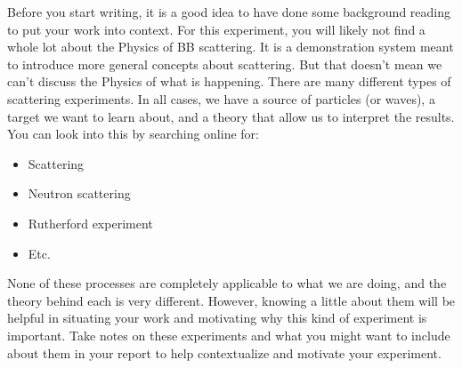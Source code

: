 \documentclass[11pt]{article}
\begin{document}
Before you start writing, it is a good idea to have done some background reading to put your work into context. For this experiment, you will likely not find a whole lot about the Physics of BB scattering. It is a demonstration system meant to introduce more general concepts about scattering. But that doesn't mean we can't discuss the Physics of what is happening. There are many different types of scattering experiments. In all cases, we have a source of particles (or waves), a target we want to learn about, and a theory that allow us to interpret the results. You can look into this by searching online for:

\begin{itemize}
 \item Scattering
 \item Neutron scattering
 \item Rutherford experiment
 \item Etc.
\end{itemize}

None of these processes are completely applicable to what we are doing, and the theory behind each is very different. However, knowing a little about them will be helpful in situating your work and motivating why this kind of experiment is important. Take notes on these experiments and what you might want to include about them in your report to help contextualize and motivate your experiment.

\vspace{5mm}



\end{document}
